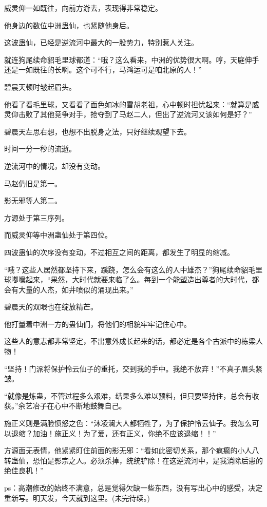 \begin{this_body}
威灵仰一如既往，向前方游去，表现得非常稳定。

他身边的数位中洲蛊仙，也紧随他身后。

这波蛊仙，已经是逆流河中最大的一股势力，特别惹人关注。

就连狗尾续命貂毛里球都道：“哦？这么看来，中洲的优势很大啊。哼，天庭伸手还是一如既往的长啊。这个可不行，马鸿运可是咱北原的人！”

碧晨天顿时皱起眉头。

他看了看毛里球，又看看了面色如冰的雪胡老祖，心中顿时担忧起来：“就算是威灵仰击败了其他竞争对手，抢夺到了马赵二人，但出了逆流河又该如何是好？”

碧晨天左思右想，也想不出脱身之法，只好继续观望下去。

时间一分一秒的流逝。

逆流河中的情况，却没有变动。

马赵仍旧是第一。

影无邪等人第二。

方源处于第三序列。

而威灵仰等中洲蛊仙处于第四位。

四波蛊仙的次序没有变动，不过相互之间的距离，都发生了明显的缩减。

“哦？这些人居然都坚持下来，蹊跷，怎么会有这么的人中雄杰？”狗尾续命貂毛里球嘟囔起来，“果然，大时代就要来临了么。每到一个能塑造出尊者的大时代，都会有大量的人杰，如井喷似的涌现出来。”

碧晨天的双眼也在绽放精芒。

他打量着中洲一方的蛊仙们，将他们的相貌牢牢记住心中。

这些人的意志都非常坚定，不出意外成长起来的话，都必定是各个古派中的栋梁人物！

“坚持！门派将保护怜云仙子的重托，交到我的手中。我绝不放弃！”不真子眉头紧皱。

“就像是炼蛊，不管过程多么艰难，结果多么难以预料，但只要坚持住，总会有收获。”余艺冶子在心中不断地鼓舞自己。

施正义则是满脸愤怒之色：“沐凌澜大人都牺牲了，为了保护怜云仙子。我怎么可以退缩？加油！施正义！为了爱，还有正义，你绝不应该退缩！！”

方源面无表情，他紧紧盯住前面的影无邪：“看如此密切关系，那个疯癫的小人八转蛊仙，恐怕是影宗之人。必须杀掉，统统铲除！在这逆流河中，是我消除后患的绝佳良机！”

ps：高潮修改的始终不满意，总是觉得欠缺一些东西，没有写出心中的感受，决定重新写。明天发，今天就到这里。(未完待续。)

\end{this_body}

